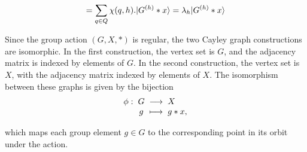 \documentclass[11pt]{article}
\theoremstyle{definition}
\newcommand{\qft}{\mathsf{QFT}}
\begin{document}
    \[
    = \sum_{q \in Q}\chi(q,h).\lvert G^{(h)}*x\rangle = \lambda_h \lvert G^{(h)}*x\rangle
    \]

    Since the group action \( (G, X, *) \) is regular, the two Cayley graph constructions are isomorphic. In the first construction, the vertex set is \( G \), and the adjacency matrix is indexed by elements of \( G \). In the second construction, the vertex set is \( X \), with the adjacency matrix indexed by elements of \( X \). The isomorphism between these graphs is given by the bijection
\[
\setlength{\arraycolsep}{1mm}
\begin{array}{rcll}
\phi: & G & \longrightarrow & X \\
      & g & \longmapsto     & g * x,
\end{array}
\]

which maps each group element \( g \in G \) to the corresponding point in its orbit under the action.


    
\end{document}
